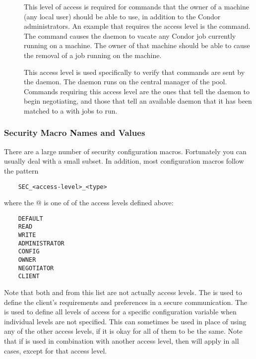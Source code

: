 \begin{description}
\item[] \label{sec-level-owner} This level of access is
   required for commands that the owner of a machine (any local user)
   should be able to use, in addition to the Condor administrators.
   An example that requires the  access level is
   the  command.
   The command causes the  daemon to vacate any
   Condor job currently running on a machine.
   The owner of that machine should be able to cause the removal
   of a job running on the machine.

\item[] \label{sec-level-negotiator} This 
   access level is used specifically to verify that commands are
   sent by the  daemon.
   The  daemon runs on the central manager of
   the pool.
   Commands requiring this access
   level are the ones that tell the  daemon to begin
   negotiating, and those that tell an available  daemon
   that it has been matched to a  with jobs to run.

\end{description}

\subsubsection{\label{sec:Security-NamesValues} Security Macro Names and Values}

There are a large number of security configuration macros. Fortunately
you can usually deal with a small subset. In addition, most
configuration macros follow the pattern
\begin{verbatim}
    SEC_<access-level>_<type>
\end{verbatim}
where the @ is one of of the access levels defined above: 
\begin{verbatim}
    DEFAULT
    READ
    WRITE
    ADMINISTRATOR
    CONFIG
    OWNER
    NEGOTIATOR
    CLIENT
\end{verbatim}

Note that both  and  
from this list are not actually access levels.
The  is used to define the client's requirements
and preferences in a secure communication.
The  is used to define all levels of access
for a specific configuration variable when individual levels
are not specified. 
This can sometimes be used in place of using any of
the other access levels,
if it is okay for all of them to be the same. 
Note that if  is used in combination with another
access level, then  will apply in all cases, except
for that access level. 

